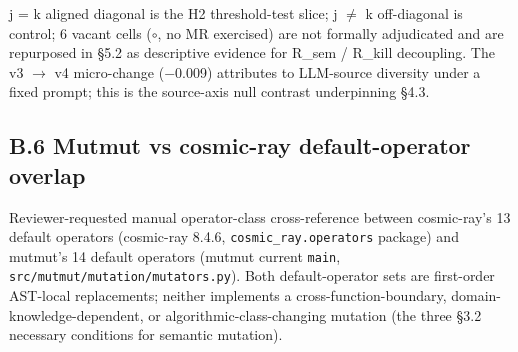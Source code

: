 \documentclass[manuscript,screen,review]{acmart}
\begin{document}
j = k aligned diagonal is the H2 threshold-test slice; j $\neq$ k
off-diagonal is control; 6 vacant cells ($\circ$, no MR exercised) are not formally
adjudicated and are repurposed in §5.2 as descriptive evidence for
R\_sem / R\_kill decoupling. The v3 $\to$ v4 micro-change ($-$0.009)
attributes to LLM-source diversity under a fixed prompt; this is the
source-axis null contrast underpinning §4.3.

\subsection{B.6 Mutmut vs cosmic-ray default-operator overlap}\label{b.6-mutmut-vs-cosmic-ray-default-operator-overlap}

Reviewer-requested manual operator-class cross-reference between
cosmic-ray's 13 default operators (cosmic-ray 8.4.6,
\texttt{cosmic\_ray.operators} package) and mutmut's 14 default
operators (mutmut current \texttt{main},
\texttt{src/mutmut/mutation/mutators.py}). Both default-operator sets
are first-order AST-local replacements; neither implements a
cross-function-boundary, domain-knowledge-dependent, or
algorithmic-class-changing mutation (the three §3.2 necessary conditions
for semantic mutation).
\end{document}
